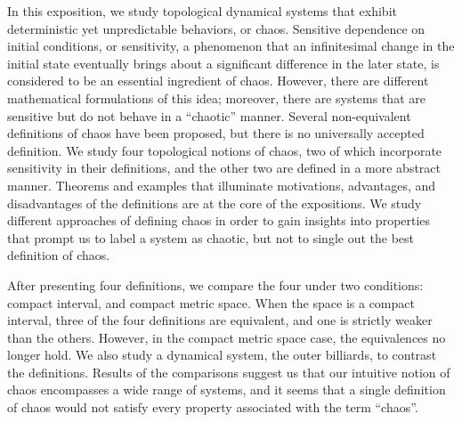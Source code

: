 \documentclass[10pt,twoside,draft]{book}
\begin{document}
In this exposition, we study topological dynamical systems that exhibit deterministic yet unpredictable behaviors, or chaos.
Sensitive dependence on initial conditions, or sensitivity, a phenomenon that an infinitesimal change in the initial state eventually brings about a significant difference in the later state, is considered to be an essential ingredient of chaos. 
However, there are different mathematical formulations of this idea; moreover, there are systems that are sensitive but do not behave in a ``chaotic'' manner.
Several non-equivalent definitions of chaos have been proposed, but there is no universally accepted definition.
We study four topological notions of chaos, two of which incorporate sensitivity in their definitions, and the other two are defined in a more abstract manner. %
Theorems and examples that illuminate motivations, advantages, and disadvantages of the definitions are at the core of the expositions.
We study different approaches of defining chaos in order to gain insights into properties that prompt us to label a system as chaotic, but not to single out the best definition of chaos.

After presenting four definitions, we compare the four under two conditions: compact interval, and compact metric space.
When the space is a compact interval, three of the four definitions are equivalent, and one is strictly weaker than the others.
However, in the compact metric space case, the equivalences no longer hold.
We also study a dynamical system, the outer billiards, to contrast the definitions. %
Results of the comparisons suggest us that our intuitive notion of chaos encompasses a wide range of systems, and it seems that a single definition of chaos would not satisfy every property associated with the term ``chaos''.



\end{document}
